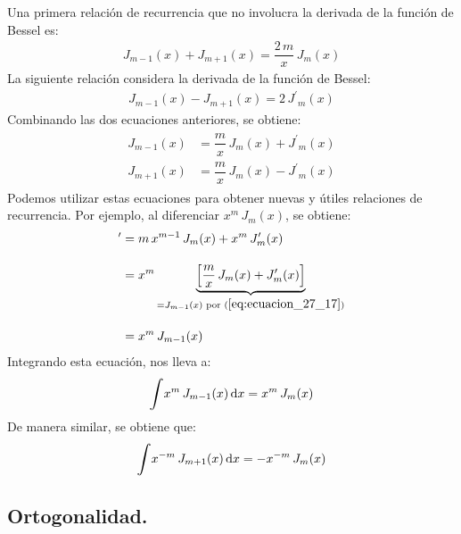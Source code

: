 \documentclass[12pt]{article}
\newcommand{\pderivada}[1]{\ensuremath{{#1}^{\prime}}}
\def\scaleint#1{\vcenter{\hbox{\scaleto[3ex]{\displaystyle\int}{#1}}}}
\numberwithin{equation}{section}
\begin{document}
Una primera relación de recurrencia que no involucra la derivada de la función de Bessel es:
\begin{align}
J_{m-1} (x) + J_{m+1} (x) = \dfrac{2 \, m}{x} \, J_{m} (x)
\label{eq:ecuacion_27_15}
\end{align}
La siguiente relación considera la derivada de la función de Bessel:
\begin{align}
J_{m-1} (x) - J_{m+1} (x) = 2 \, \pderivada{J}_{m} (x)
\label{eq:ecuacion_27_16}
\end{align}
Combinando las dos ecuaciones anteriores, se obtiene:
\begin{align}
\begin{aligned}
J_{m-1}(x) &= \dfrac{m}{x} \, J_{m} (x) + \pderivada{J}_{m} (x) \\[0.5em] 
J_{m+1}(x) &= \dfrac{m}{x} \, J_{m} (x) - \pderivada{J}_{m} (x)
\end{aligned}
\label{eq:ecuacion_27_17}
\end{align}
Podemos utilizar estas ecuaciones para obtener nuevas y útiles relaciones de recurrencia. Por ejemplo, al diferenciar $x^{m} \, J_{m} (x)$, se obtiene:
\begin{align*}
[x^{m} \, J_{m} (x)]^{\prime} &= m \, x^{m-1} \, J_{m} (x) + x^{m} \, \pderivada{J}_{m} (x) \\[1em] 
&= x^{m} \underbrace{ \left[ \dfrac{m}{x} \, J_{m} (x) + \pderivada{J}_{m} (x)\right]}_{=J_{m-1}(x) \text{ por } (\ref{eq:ecuacion_27_17})}  \\[1em] 
&= x^{m} \, J_{m-1} (x)
\end{align*}
Integrando esta ecuación, nos lleva a:
\begin{align}
\scaleint{6ex} x^{m} \, J_{m-1} (x) \dd{x} = x^{m} \, J_{m} (x)
\label{eq:ecuacion_27_18}
\end{align}
De manera similar, se obtiene que:
\begin{align}
\scaleint{6ex} x^{-m} \, J_{m+1} (x) \dd{x} = -x^{-m} \, J_{m} (x)
\label{eq:eccion_27_19.}
\end{align}

\subsection{Ortogonalidad.}
\end{document}
